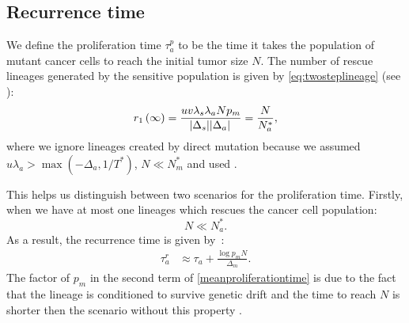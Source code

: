 \documentclass[12pt]{extarticle}
\begin{document}
\begin{appendices}
\section{Recurrence time}\label{sec:appendix_recurrence_time}
We define the proliferation time $\tau_a^p$  to be the time it takes the population of mutant cancer cells to reach the initial tumor size $N$. The number of rescue lineages generated by the sensitive population is given by  \cref{eq:twosteplineage} (see ):
\begin{equation*}
r_1\left(\infty\right)=\frac{uv\lambda_s\lambda_aNp_m}{\abs{\Delta_s}\abs{\Delta_a}}=\frac{N}{N_a^*},
\end{equation*}
where we ignore lineages created by direct mutation because we assumed $u\lambda_a > \max{(-\Delta_a, 1/T^*)}$, $N\ll N_m^*$ and used .

This helps us distinguish between two scenarios for the proliferation time. Firstly, when we have at most one lineages which rescues the cancer cell population:
\begin{equation*}
N\ll N_a^*.
\end{equation*}
As a result, the recurrence time is given by~\citep{avanzini2019cancer}:
\begin{align}\label{meanproliferationtime}
\tau_a^r&\approx\tau_a+\frac{\log p_mN}{\Delta_m}.
\end{align}
The factor of $p_m$ in the second term of \cref{meanproliferationtime} is due to the fact that the lineage is conditioned to survive genetic drift and the time to reach $N$ is shorter then the scenario without this property \citep{orr2014population,smith1974hitch}. %


\end{appendices}
\end{document}
